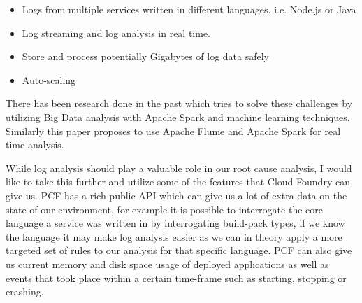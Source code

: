\begin{itemize}
  \item Logs from multiple services written in different languages. i.e. Node.js or Java
  \item Log streaming and log analysis in real time. 
  \item Store and process potentially Gigabytes of log data safely
  \item Auto-scaling
\end{itemize}

There has been research done in the past which tries to solve these challenges by utilizing Big Data analysis with Apache Spark and machine learning techniques\cite{8067504}. Similarly this paper\cite{7748933} proposes to use Apache Flume and Apache Spark for real time analysis. 

While log analysis should play a valuable role in our root cause analysis, I would like to take this further and utilize some of the features that Cloud Foundry can give us. PCF has a rich public API which can give us a lot of extra data on the state of our environment, for example it is possible to interrogate the core language a service was written in by interrogating build-pack types, if we know the language it may make log analysis easier as we can in theory apply a more targeted set of rules to our analysis for that specific language. PCF can also give us current memory and disk space usage of deployed applications as well as events that took place within a certain time-frame such as starting, stopping or crashing.